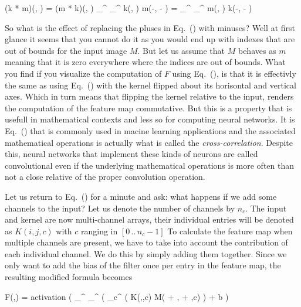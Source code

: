 \startplaceformula[reference=conv-commute]
\startformula
\startmathalignment
\NC (k * m)(\color[red]{x}, \color[red]{y}) \NC = (m * k)(\color[blue]{x}, \color[blue]{y}) \NR
\NC \sum_{\color[blue]{x}}^{} \sum_{\color[blue]{y}}^{} k(\color[blue]{x}, \color[blue]{y}) \cdot m(\color[red]{x}-\color[blue]{x}, \color[red]{y} - \color[blue]{y}) \NC
= \sum_{\color[red]{x}}^{} \sum_{\color[red]{y}}^{} m(\color[red]{x}, \color[red]{y}) \cdot k(\color[blue]{x}-\color[red]{x}, \color[blue]{y} - \color[red]{y}) \NR
\stopmathalignment
\stopformula
\stopplaceformula

\indentation
So what is the effect of replacing the pluses in Eq.~() with minuses?
Well at first glance it seems that you cannot do it as you would end up with indexes that are out of bounds for the input image $M$.
But let us assume that $M$ behaves as $m$ meaning that it is zero everywhere where the indices are out of bounds.
What you find if you visualize the computation of $F$ using Eq.~(), is that it is effectivly the same as using Eq.~() with the kernel flipped about its horisontal and vertical axes.
Which in turn means that flipping the kernel relative to the input, renders the computation of the feature map commutative.
But this is a property that is usefull in mathematical contexts and less so for computing neural networks.
It is Eq.~() that is commonly used in macine learning applications and the associated mathematical operations is actually what is called the {\em cross-correlation}.
Despite this, neural networks that implement these kinds of neurons are called convolutional even if the underlying mathematical operations is more often than not a close relative of the proper convolution operation.
\stopsubsubsection

\startsubsubsection[title=Multiple channels]
Let us return to Eq.~() for a minute and ask: what happens if we add some channels to the input?
Let us denote the number of channels by $n_c$.
The input and kernel are now multi-channel arrays, their individual entries will be denoted as $K(i,j,c)$ with $c$ ranging in $[0 \, .. \, n_c - 1]$
To calculate the feature map when multiple channels are present, we have to take into account the contribution of each individual channel.
We do this by simply adding them together.
Since we only want to add the bias of the filter once per entry in the feature map, the resulting modified formula becomes

\startplaceformula[reference=devel-feature-4]
\startformula
F(\color[red]{x},\color[red]{y})
=
{\rm activation}
\left( 
\sum_{\color[blue]{y}}^{}
\sum_{\color[blue]{x}}^{}
\left(
\sum_{c}^{}
\Bigl(
K(\color[blue]{x},\color[blue]{y},c)
\cdot
M(\color[red]{x} + \color[blue]{x}, \color[red]{y} + \color[blue]{y},c)
\right)
+
b
\right)
\stopformula
\stopplaceformula
\stopsubsubsection

